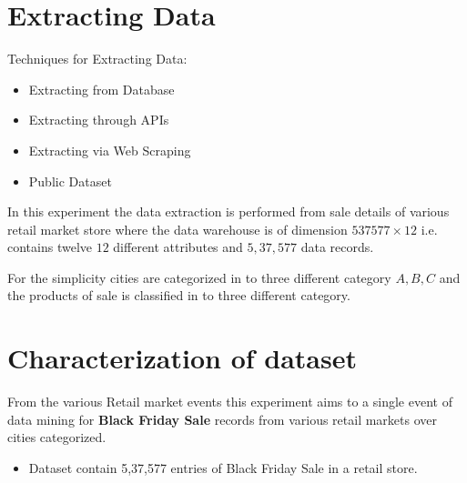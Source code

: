 \documentclass[paper=letter, fontsize=12pt]{article}
\begin{document}
\section{Extracting Data}
Techniques for Extracting Data:
\begin{itemize}
    \item Extracting from Database
    \item Extracting through APIs
    \item Extracting via Web Scraping
    \item Public Dataset
\end{itemize}
In this experiment the data extraction is performed from sale details of various retail market store where the data warehouse is of dimension $ 537577 \times 12 $ i.e. contains twelve $ 12 $ different attributes and $ 5,37,577 $ data records.

For the simplicity cities are categorized in to three different category $ A, B, C $ and the products of sale is classified in to three different category.

\section{Characterization of dataset}
From the various Retail market events this experiment aims to a single event of data mining for \textbf{Black Friday Sale} records from various retail markets over cities categorized.

\begin{itemize}
	\item Dataset contain 5,37,577 entries of Black Friday Sale in a retail store.
\end{itemize}
\end{document}
